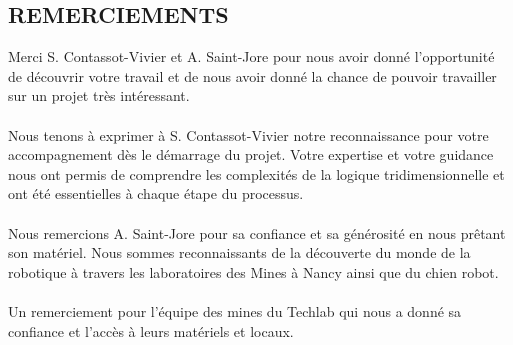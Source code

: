 \thispagestyle{empty} %
\begin{center}
    \section{\huge\textbf{{REMERCIEMENTS}}}
\end{center}

\normalsize{
    Merci S. Contassot-Vivier et A. Saint-Jore pour nous avoir donné l'opportunité de découvrir votre travail et de nous avoir donné la chance de pouvoir travailler sur un projet très intéressant.
}
\\ \\
\normalsize{
    Nous tenons à exprimer à S. Contassot-Vivier notre reconnaissance pour votre accompagnement dès le démarrage du projet. Votre expertise et votre guidance nous ont permis de comprendre les complexités de la logique tridimensionnelle et ont été essentielles à chaque étape du processus.
}
\\ \\
\normalsize{
    Nous remercions A. Saint-Jore pour sa confiance et sa générosité en nous prêtant son matériel. Nous sommes reconnaissants de la découverte du monde de la robotique à travers les laboratoires des Mines à Nancy ainsi que du chien robot.
}
\\ \\
\normalsize{
    Un remerciement pour l'équipe des mines du Techlab qui nous a donné sa confiance et l'accès à leurs matériels et locaux.
}

\clearpage